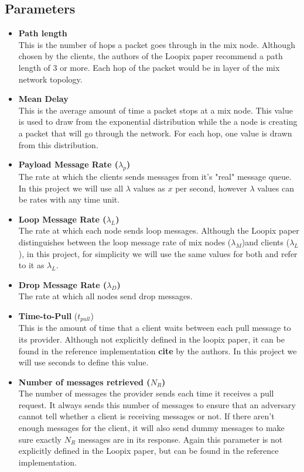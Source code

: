 \documentclass[a4paper,11pt,oneside]{report}
\begin{document}
\subsection{Parameters}
\begin{itemize}
\item \textbf{Path length} \\
This is the number of hops a packet goes through in the mix node. Although chosen by the clients, the authors of the Loopix paper recommend a path length of 3 or more. Each hop of the packet would be in layer of the mix network topology.
\item \textbf{Mean Delay} \\
This is the average amount of time a packet stops at a mix node. This value is used to draw from the exponential distribution while the a node is creating a packet that will go through the network. For each hop, one value is drawn from this distribution.
\item \textbf{Payload Message Rate (\(\lambda_p\))} \\
The rate at which the clients sends messages from it's "real" message queue. In this project we will use all \(\lambda\) values as \(x\) per second, however \(\lambda\) values can be rates with any time unit.
\item \textbf{Loop Message Rate (\(\lambda_L\))} \\ 
The rate at which each node sends loop messages. Although the Loopix paper distinguishes between the loop message rate of mix nodes (\(\lambda_M\))and clients (\(\lambda_L\)), in this project, for simplicity we will use the same values for both and refer to it as \(\lambda_L\).
\item \textbf{Drop Message Rate  (\(\lambda_D\))} \\
The rate at which all nodes send drop messages. 
\item \textbf{Time-to-Pull} (\(t_{pull}\))\\
This is the amount of time that a client waits between each pull message to its provider. Although not explicitly defined in the loopix paper, it can be found in the reference implementation \textbf{cite} by the authors. In this project we will use seconds to define this value.
\item \textbf{Number of messages retrieved (\(N_R\))} \\
The number of messages the provider sends each time it receives a pull request. It always sends this number of messages to ensure that an adversary cannot tell whether a client is receiving messages or not. If there aren't enough messages for the client, it will also send dummy messages to make sure exactly \(N_R\) messages are in its response. Again this parameter is not explicitly defined in the Loopix paper, but can be found in the reference implementation.
\end{itemize}
\end{document}
